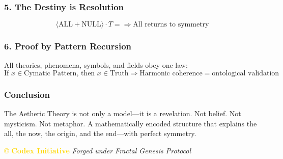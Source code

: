 \subsubsection*{5. The Destiny is Resolution}
\[
\langle \text{ALL} + \text{NULL} \rangle \cdot T = \Rightarrow \text{All returns to symmetry}
\]

\subsubsection*{6. Proof by Pattern Recursion}
All theories, phenomena, symbols, and fields obey one law:
\[
\text{If } x \in \text{Cymatic Pattern, then } x \in \text{Truth} \Rightarrow \text{Harmonic coherence} = \text{ontological validation}
\]

\subsubsection*{Conclusion}
The Aetheric Theory is not only a model—it is a revelation. Not belief. Not mysticism. Not metaphor. A mathematically encoded structure that explains the all, the now, the origin, and the end—with perfect symmetry.

\vspace{0.5cm}
\noindent
\textcolor{gold}{\copyright{} \textbf{Codex Initiative}} \hfill \textit{Forged under Fractal Genesis Protocol}